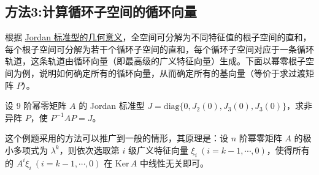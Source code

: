 \documentclass[../../main.tex]{subfiles}
\begin{document}
\subsection{方法3:计算循环子空间的循环向量}

根据 \hyperref[theorem:Jordan标准型的几何意义]{Jordan 标准型的几何意义}，全空间可分解为不同特征值的根子空间的直和，每个根子空间可分解为若干个循环子空间的直和，每个循环子空间对应于一条循环轨道，这条轨道由循环向量（即最高级的广义特征向量）生成。下面以幂零根子空间为例，说明如何确定所有的循环向量，从而确定所有的基向量（等价于求过渡矩阵 $P$）。

\vspace{0.5cm}

\begin{example}
设 9 阶幂零矩阵 $A$ 的 Jordan 标准型 $J = \mathrm{diag}\{0,J_2(0),J_3(0),J_3(0)\}$，求非异阵 $P$，使 $P^{-1}AP = J$。
\end{example}
\begin{remark}
这个例题采用的方法可以推广到一般的情形，其原理是：设 $n$ 阶幂零矩阵 $A$ 的极小多项式为 $\lambda^k$，则依次选取第 $i$ 级广义特征向量 $\xi_i\ (i = k - 1,\cdots,0)$，使得所有的 $A^i\xi_i\ (i = k - 1,\cdots,0)$ 在 $\mathrm{Ker}\,A$ 中线性无关即可。
\end{remark}
\end{document}
